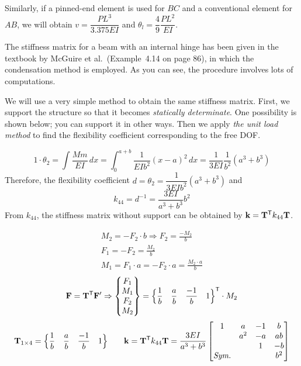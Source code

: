 \begin{example}
Similarly, if a pinned-end element is used for $BC$ and a conventional element for $AB$, we will obtain $v = \dfrac{PL^3}{3.375EI}$ and $\theta_l = \dfrac49\dfrac{PL^2}{EI}$.
\end{example}

\begin{example}
The stiffness matrix for a beam with an internal hinge has been given in the textbook by McGuire et al.\ (Example~4.14 on page 86), in which the condensation method is employed. As you can see, the procedure involves lots of computations.

We will use a very simple method to obtain the same stiffness matrix. First, we support the structure so that it becomes \emph{statically determinate}. One possibility is shown below; you can support it in other ways. Then we apply \emph{the unit load method} to find the flexibility coefficient corresponding to the free DOF.
\begin{fig}
  
\end{fig}
\begin{equation*}
  1\cdot\theta_2 = \int\frac{Mm}{EI}\,dx = \int_0^{a+b}\frac{1}{EIb^2}(x-a)^2\,dx = \frac{1}{3EI}\frac{1}{b^2}(a^3 + b^3)
\end{equation*}
Therefore, the flexibility coefficient $d = \theta_2 = \dfrac{1}{3EIb^2}(a^3+b^3)$ and
\begin{equation*}
  k_{44} = d^{-1} = \frac{3EI}{a^3+b^3}b^2
\end{equation*}
From $k_{44}$, the stiffness matrix without support can be obtained by $\mathbf{k} = \mathbf{T}^{\mathsf{T}} k_{44}\mathbf{T}$.
\begin{fig}
  
\end{fig}
\begin{gather*}
  M_2 = -F_2\cdot b \Rightarrow F_2 = \frac{-M_2}{b}\\
  F_1 = -F_2 = \frac{M_2}{b}\\
  M_1 = F_1\cdot a = -F_2\cdot a = \frac{M_2\cdot a}{b}
\end{gather*}
\begin{equation*}
  \mathbf{F} = \mathbf{T}^{\mathsf{T}}\mathbf{F}' \Rightarrow \begin{Bmatrix}F_1\\ M_1\\ F_2\\ M_2\end{Bmatrix} = \Bigl\{\frac1b\quad\frac ab\quad\frac{-1}{b}\quad 1\Bigr\}^{\mathsf{T}}\cdot M_2
\end{equation*}
\begin{equation*}
  \mathbf{T}_{1\times4} = \Bigl\{\frac1b\quad\frac ab\quad\frac{-1}{b}\quad 1\Bigr\}\qquad
  \mathbf{k} = \mathbf{T}^{\mathsf{T}} k_{44}\mathbf{T} = \frac{3EI}{a^3+b^3}
  \begin{bmatrix}1 & a & -1 & b\\ & a^2 & -a & ab\\ & & 1 & -b\\ \textit{Sym.} & & & b^2\end{bmatrix}
\end{equation*}
\end{example}

